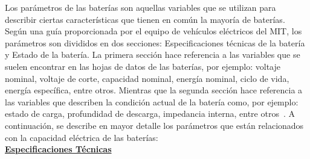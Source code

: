 Los parámetros de las baterías son aquellas variables que se utilizan para describir ciertas características que tienen en común la mayoría de baterías. Según una guía proporcionada por el equipo de vehículos eléctricos del MIT, los parámetros son divididos en dos secciones: Especificaciones técnicas de la batería y Estado de la batería. La primera sección hace referencia a las variables que se suelen encontrar en las hojas de datos de las baterías, por ejemplo: voltaje nominal, voltaje de corte, capacidad nominal, energía nominal, ciclo de vida, energía específica, entre otros. Mientras que la segunda sección hace referencia a las variables que describen la condición actual de la batería como, por ejemplo: estado de carga, profundidad de descarga, impedancia interna, entre otros~\cite{MIT-2008}. A continuación, se describe en mayor detalle los parámetros que están relacionados con la capacidad eléctrica de las baterías: \\

\textbf{\underline{Especificaciones Técnicas}}

